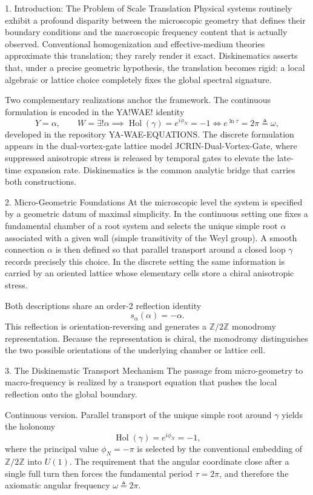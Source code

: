 1. Introduction: The Problem of Scale Translation
Physical systems routinely exhibit a profound disparity between the microscopic geometry that defines their boundary conditions and the macroscopic frequency content that is actually observed. Conventional homogenization and effective-medium theories approximate this translation; they rarely render it exact. Diskinematics asserts that, under a precise geometric hypothesis, the translation becomes rigid: a local algebraic or lattice choice completely fixes the global spectral signature.

Two complementary realizations anchor the framework. The continuous formulation is encoded in the YA!WAE! identity  
\[
Y=\alpha,\qquad W=\exists!\alpha\implies\operatorname{Hol}(\gamma)=e^{i\phi_N}=-1\iff e^{\ln\tau}=2\pi\triangleq\omega,
\]  
developed in the repository YA-WAE-EQUATIONS. The discrete formulation appears in the dual-vortex-gate lattice model JCRIN-Dual-Vortex-Gate, where suppressed anisotropic stress is released by temporal gates to elevate the late-time expansion rate. Diskinematics is the common analytic bridge that carries both constructions.

2. Micro-Geometric Foundations
At the microscopic level the system is specified by a geometric datum of maximal simplicity. In the continuous setting one fixes a fundamental chamber of a root system and selects the unique simple root \(\alpha\) associated with a given wall (simple transitivity of the Weyl group). A smooth connection \(\alpha\) is then defined so that parallel transport around a closed loop \(\gamma\) records precisely this choice. In the discrete setting the same information is carried by an oriented lattice whose elementary cells store a chiral anisotropic stress.

Both descriptions share an order-2 reflection identity  
\[
s_\alpha(\alpha)=-\alpha.
\]  
This reflection is orientation-reversing and generates a \(\mathbb{Z}/2\mathbb{Z}\) monodromy representation. Because the representation is chiral, the monodromy distinguishes the two possible orientations of the underlying chamber or lattice cell.

3. The Diskinematic Transport Mechanism
The passage from micro-geometry to macro-frequency is realized by a transport equation that pushes the local reflection onto the global boundary.

Continuous version. Parallel transport of the unique simple root around \(\gamma\) yields the holonomy  
\[
\operatorname{Hol}(\gamma)=e^{i\phi_N}=-1,
\]  
where the principal value \(\phi_N=-\pi\) is selected by the conventional embedding of \(\mathbb{Z}/2\mathbb{Z}\) into \(U(1)\). The requirement that the angular coordinate close after a single full turn then forces the fundamental period \(\tau=2\pi\), and therefore the axiomatic angular frequency \(\omega\triangleq 2\pi\).

